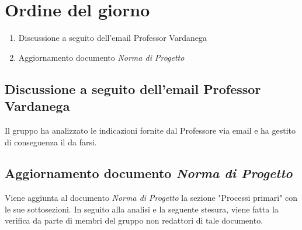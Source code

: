 \section{Ordine del giorno}
\begin{enumerate}
\item Discussione a seguito dell'email Professor Vardanega
\item Aggiornamento documento \textit{Norma di Progetto}
\end{enumerate}

\subsection{Discussione a seguito dell'email Professor Vardanega}
Il gruppo ha analizzato le indicazioni fornite dal Professore via email e ha gestito di conseguenza il da farsi. 
\subsection{Aggiornamento documento \textit{Norma di Progetto}}
Viene aggiunta al documento \textit{Norma di Progetto} la sezione "Processi primari" con le sue sottosezioni. In seguito alla analisi e la seguente stesura, viene fatta la verifica da parte di membri del gruppo non redattori di tale documento. 